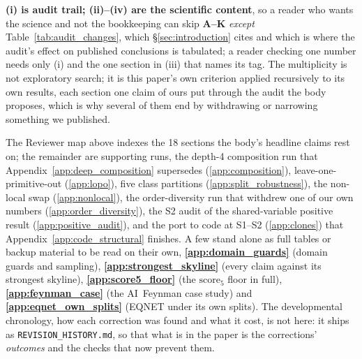 \noindent \textbf{(i) is audit trail; (ii)--(iv) are the scientific content}, so a reader who wants the science and not the bookkeeping can skip \textbf{A--K} \emph{except} Table~\ref{tab:audit_changes}, which \S\ref{sec:introduction} cites and which is where the audit's effect on published conclusions is tabulated; a reader checking one number needs only (i) and the one section in (iii) that names its tag. The multiplicity is not exploratory search; it is this paper's own criterion applied recursively to its own results, each section one claim of ours put through the audit the body proposes, which is why several of them end by withdrawing or narrowing something we published.

The Reviewer map above indexes the 18 sections the body's headline claims rest on; the remainder are supporting runs, the depth-4 composition run that Appendix~\ref{app:deep_composition} supersedes (\ref{app:composition}), leave-one-primitive-out (\ref{app:lopo}), five class partitions (\ref{app:split_robustness}), the non-local swap (\ref{app:nonlocal}), the order-diversity run that withdrew one of our own numbers (\ref{app:order_diversity}), the S2 audit of the shared-variable positive result (\ref{app:positive_audit}), and the port to code at S1--S2 (\ref{app:clones}) that Appendix~\ref{app:code_structural} finishes. A few stand alone as full tables or backup material to be read on their own, \textbf{\ref{app:domain_guards}} (domain guards and sampling), \textbf{\ref{app:strongest_skyline}} (every claim against its strongest skyline), \textbf{\ref{app:score5_floor}} (the $\mathrm{score}_5$ floor in full), \textbf{\ref{app:feynman_case}} (the AI~Feynman case study) and \textbf{\ref{app:eqnet_own_splits}} (EQNET under its own splits). The developmental chronology, how each correction was found and what it cost, is not here: it ships as \texttt{REVISION\_HISTORY.md}, so that what is in the paper is the corrections' \emph{outcomes} and the checks that now prevent them.




